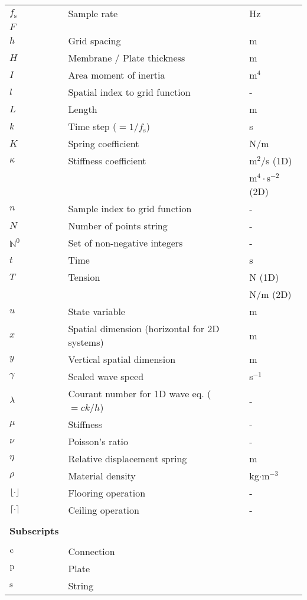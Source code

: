 {\begin{longtable}{ p{2cm} p{6.5cm} p{2.5cm}  }
 $f_\text{s}$ & Sample rate & Hz\\
 $F$ &  & \\
 $h$ & Grid spacing & m \\ 
 $H$ & Membrane / Plate thickness & m \\ 
 $I$ & Area moment of inertia & m$^4$\\
 $l$ & Spatial index to grid function & - \\
 $L$ & Length & m\\
 $k$ & Time step ($=1/f_\text{s}$) & s\\
 $K$ & Spring coefficient & N/m\\
 $\kappa$ & Stiffness coefficient & m$^2$/s (1D)\\
 & & m$^4\cdot$s$^{-2}$ (2D)\\
 $n$ & Sample index to grid function & - \\
 $N$ & Number of points string & -\\
 $\mathbb{N}^0$ & Set of non-negative integers %
 & -\\
 $t$ & Time & s\\
 $T$ & Tension & N (1D)\\
 & & N/m (2D)\\
 $u$ & State variable & m\\ 
 $x$ & Spatial dimension (horizontal for 2D systems) & m\\
 $y$ & Vertical spatial dimension & m\\
 $\gamma$ & Scaled wave speed & s$^{-1}$\\
 $\lambda$ & Courant number for 1D wave eq. ($=ck/h$) & -\\
 $\mu$ & Stiffness  & -\\
 $\nu$ & Poisson's ratio & -\\
 $\eta$ & Relative displacement spring & m\\
 $\rho$ & Material density & kg$\cdot$m$^{-3}$\\
 $\floor[\cdot]$ & Flooring operation & - \\
 $\ceil[\cdot]$ & Ceiling operation & -\\
 \\\hline
 {\bf Subscripts}\\\hline
 \\
 $\text{c}$ & Connection &\\
 $\text{p}$ & Plate & \\
 $\text{s}$ & String &
\end{longtable}}